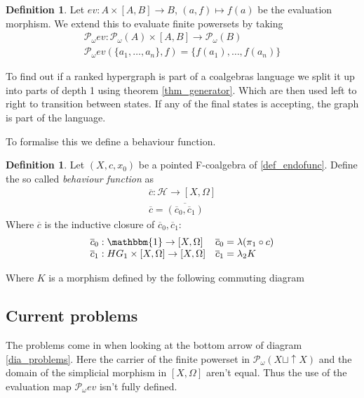 \documentclass[12pt]{article}
\theoremstyle{definition}
\newtheorem{definition}[theorem]{Definition}
\newcommand{\1}{\mathbbm{1}}
\newcommand{\id}{\text{id}}
\renewcommand{\H}{\mathcal{H}}
\newcommand{\finP}{\mathcal{P}_{\omega}}
\newcommand{\beh}{\overline{c}}
\begin{document}
\begin{definition}
    Let $ev: A\times [A,B] \to B$, $(a, f)\mapsto f(a)$ be the evaluation morphism. We extend this to evaluate finite powersets by taking
    \begin{align*}
        \finP ev: \finP(A)\times [A,B] \to \finP(B)\\
        \finP ev(\{a_1, \dots, a_n\}, f) = \{f(a_1), \dots, f(a_n)\}
    \end{align*}
\end{definition}

To find out if a ranked hypergraph is part of a coalgebras language we split it up into parts of depth 1 using theorem \ref{thm_generator}. Which are then used left to right to transition between states. If any of the final states is accepting, the graph is part of the language.

To formalise this we define a behaviour function.

\begin{definition}
    Let $(X, c, x_0)$ be a pointed F-coalgebra of \ref{def_endofunc}. Define the so called \emph{behaviour function} as
    \begin{align*}
        \beh : \H \to [X, \Omega] \\
        \beh = \overline{(\beh_0, \beh_1)}
    \end{align*}
    Where $\beh$ is the inductive closure of $\beh_0, \beh_1$:\\
    \[
        \begin{array}{ll}
            \beh_0: \1 \to [X, \Omega] & \beh_0 = \lambda(\pi_1\circ c)\\
            \beh_1: HG_1\times [X, \Omega] \to [X, \Omega] & \beh_1 = \lambda_2 K
        \end{array}
    \]

    Where $K$ is a morphism defined by the following commuting diagram
    \begin{center}\label{dia_problems}
    \end{center}
\end{definition}
\subsection{Current problems} The problems come in when looking at the bottom arrow of diagram \ref{dia_problems}. Here the carrier of the finite powerset in $\finP(X\sqcup \uparrow X)$ and the domain of the simplicial morphism in $[X,\Omega]$ aren't equal. Thus the use of the evaluation map $\finP ev$ isn't fully defined.
\end{document}
